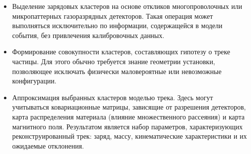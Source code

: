 \begin{itemize}
    \item Выделение зарядовых кластеров на основе откликов многопроволочных или микропаттерных газоразрядных детекторов. Такая операция может выполняться исключительно по информации, содержащейся в модели события, без привлечения калибровочных данных.
    
    \item Формирование совокупности кластеров, составляющих гипотезу о треке частицы. Для этого обычно требуется знание геометрии установки, позволяющее исключать физически маловероятные или невозможные конфигурации.
    
    \item Аппроксимация выбранных кластеров моделью трека. Здесь могут учитываться ковариационные матрицы, зависящие от разрешения детекторов, карта распределения материала (влияние множественного рассеяния) и карта магнитного поля. Результатом является набор параметров, характеризующих реконструированный трек: заряд, массу, кинематические характеристики и их ожидаемые отклонения.
    

\end{itemize}
